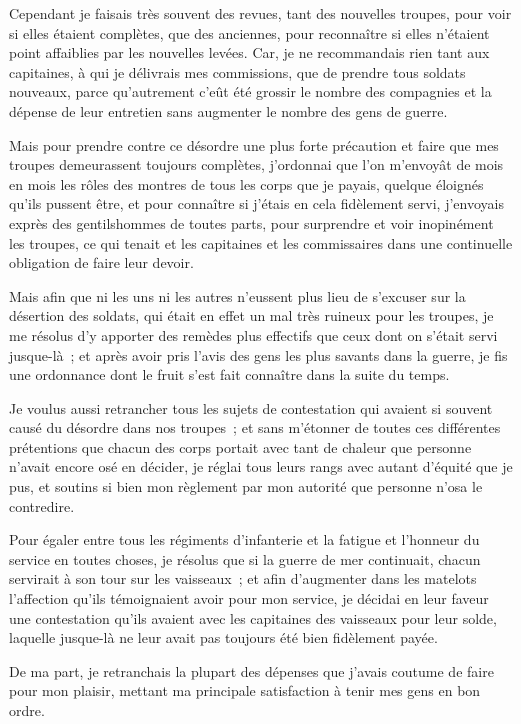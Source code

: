 \documentclass[french,twoside]{book} %
\begin{document}
Cependant je faisais très souvent des revues, tant des nouvelles troupes, pour voir si elles étaient complètes, que des anciennes, pour reconnaître si elles n’étaient point affaiblies par les nouvelles levées. Car, je ne recommandais rien tant aux capitaines, à qui je délivrais mes commissions, que de prendre tous soldats nouveaux, parce qu’autrement c’eût été grossir le nombre des compagnies et la dépense de leur entretien sans augmenter le nombre des gens de guerre.\par
Mais pour prendre contre ce désordre une plus forte précaution et faire que mes troupes demeurassent toujours complètes, j’ordonnai que l’on m’envoyât de mois en mois les rôles des montres de tous les corps que je payais, quelque éloignés qu’ils pussent être, et pour connaître si j’étais en cela fidèlement servi, j’envoyais exprès des gentilshommes de toutes parts, pour surprendre et voir inopinément les troupes, ce qui tenait et les capitaines et les commissaires dans une continuelle obligation de faire leur devoir.\par
Mais afin que ni les uns ni les autres n’eussent plus lieu de s’excuser sur la désertion des soldats, qui était en effet un mal très ruineux pour les troupes, je me résolus d’y apporter des remèdes plus effectifs que ceux dont on s’était servi jusque-là ; et après avoir pris l’avis des gens les plus savants dans la guerre, je fis une ordonnance dont le fruit s’est fait connaître dans la suite du temps.\par
Je voulus aussi retrancher tous les sujets de contestation qui avaient si souvent causé du désordre dans nos troupes ; et sans m’étonner de toutes ces différentes prétentions que chacun des corps portait avec tant de chaleur que personne n’avait encore osé en décider, je réglai tous leurs rangs avec autant d’équité que je pus, et soutins si bien mon règlement par mon autorité que personne n’osa le contredire.\par
Pour égaler entre tous les régiments d’infanterie et la fatigue et l’honneur du service en toutes choses, je résolus que si la guerre de mer continuait, chacun servirait à son tour sur les vaisseaux ; et afin d’augmenter dans les matelots l’affection qu’ils témoignaient avoir pour mon service, je décidai en leur faveur une contestation qu’ils avaient avec les capitaines des vaisseaux pour leur solde, laquelle jusque-là ne leur avait pas toujours été bien fidèlement payée.\par
De ma part, je retranchais la plupart des dépenses que j’avais coutume de faire pour mon plaisir, mettant ma principale satisfaction à tenir mes gens en bon ordre.\par
\end{document}
